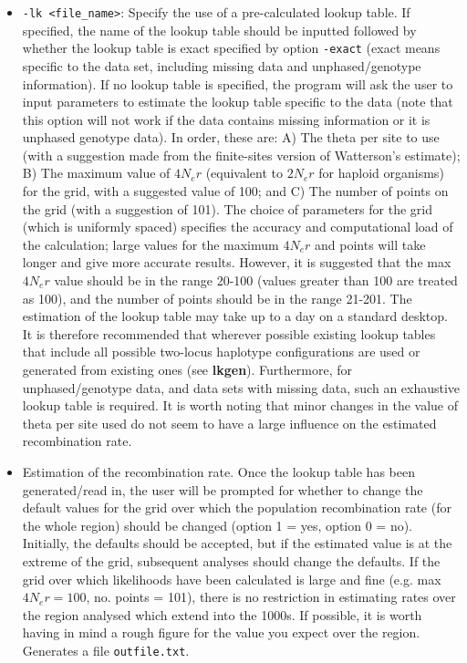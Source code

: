 \documentclass[a4paper,10pt,fullpage]{article}
\begin{document}
\begin{itemize}
\item \verb+-lk <file_name>+: Specify the use of a pre-calculated lookup table.  If specified, the
name of the lookup table should be inputted followed by whether
the lookup table is exact specified by option \verb+-exact+ (exact means specific to the data set, including
missing data and unphased/genotype information). If no lookup table is specified, the program will ask the user to input parameters to
estimate the lookup table specific to the data (note that this option will not work if the data contains missing information or it is unphased genotype data).  In order, these
are: A) The theta per site to use (with a suggestion made from the
finite-sites version of Watterson's estimate); B) The maximum
value of $4N_er$ (equivalent to $2N_er$ for haploid organisms) for
the grid, with a suggested value of 100; and C) The number of
points on the grid (with a suggestion of 101).  The choice of
parameters for the grid (which is uniformly spaced) specifies the
accuracy and computational load of the calculation; large values
for the maximum $4N_er$ and points will take longer and give more
accurate results.  However, it is suggested that the max $4N_er$
value should be in the range 20-100 (values greater than 100 are
treated as 100), and the number of points should be in the range
21-201.  The estimation of the lookup table may take up to a day
on a standard desktop.  It is therefore recommended that wherever
possible existing lookup tables that include all possible
two-locus haplotype configurations are used or generated from
existing ones (see {\bf lkgen}).  Furthermore, for
unphased/genotype data, and data sets with missing data, such an
exhaustive lookup table is required. It is worth noting that minor
changes in the value of theta per site used do not seem to have a
large influence on the estimated recombination rate.

\item Estimation of the recombination rate.  Once the lookup table
has been generated/read in, the user will be prompted for whether
to change the default values for the grid over which the
population recombination rate (for the whole region) should be
changed (option 1 = yes, option 0 = no).  Initially, the defaults
should be accepted, but if the estimated value is at the extreme
of the grid, subsequent analyses should change the defaults. If
the grid over which likelihoods have been calculated is large and
fine (e.g. max $4N_er = 100$, no. points = 101), there is no
restriction in estimating rates over the region analysed which
extend into the 1000s.  If possible, it is worth having in mind a
rough figure for the value you expect over the region.  Generates
a file {\verb+outfile.txt+}.


\end{itemize}
\end{document}
